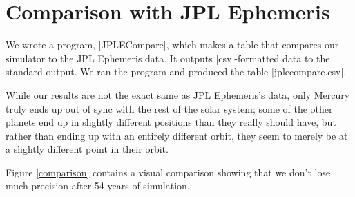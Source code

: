 \documentclass[a4paper]{article}
\begin{document}
\section{Comparison with JPL Ephemeris}

We wrote a program, \code|JPLECompare|, which makes a table that compares our simulator to the JPL Ephemeris data. It outputs \code|csv|-formatted data to the standard output. We ran the program and produced the table \code|jplecompare.csv|.

While our results are not the exact same as JPL Ephemeris's data, only Mercury truly ends up out of sync with the rest of the solar system; some of the other planets end up in slightly different positions than they really should have, but rather than ending up with an entirely different orbit, they seem to merely be at a slightly different point in their orbit.

Figure \ref{comparison} contains a visual comparison showing that we don't lose much precision after 54 years of simulation.
\end{document}
